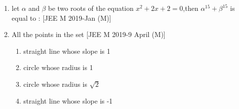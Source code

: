 \documentclass[journal,12pt,twocolumn,article]{IEEEtran}
\theoremstyle{remark}
\begin{document}
\begin{enumerate}[start = 14]
\item let $\alpha$ and $\beta$ be two roots of the equation $x^2+2x+2=0$,then $\alpha^{15}+\beta^{15}$ is equal to :                                       
\hfill{[JEE M 2019-Jan (M)]}                       
\begin{enumerate}                                   
\end{enumerate}

\item  All the points in the set 
\hfill{[JEE M 2019-9 April (M)]}                    
\begin{enumerate}                                   
                              
\item straight line whose slope is 1                
                             
\item circle whose radius is 1                      

\item circle whose radius is $\sqrt2$

\item straight line whose slope is -1

\end{enumerate}
\end{enumerate}
\end{document}
